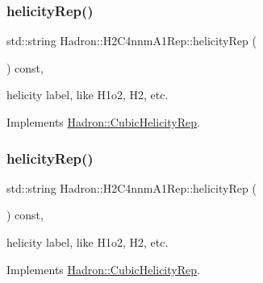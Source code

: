 \mbox{\label{structHadron_1_1H2C4nnmA1Rep_a383c3c921c06e12e6ad53f2acb09bda1}} 
\subsubsection{\texorpdfstring{helicityRep()}{helicityRep()}\hspace{0.1cm}{\footnotesize\ttfamily [1/2]}}
{\footnotesize\ttfamily std\+::string Hadron\+::\+H2\+C4nnm\+A1\+Rep\+::helicity\+Rep (\begin{DoxyParamCaption}{ }\end{DoxyParamCaption}) const\hspace{0.3cm}{\ttfamily [inline]}, {\ttfamily [virtual]}}

helicity label, like H1o2, H2, etc. 

Implements \mbox{\hyperlink{structHadron_1_1CubicHelicityRep_af1096946b7470edf0a55451cc662f231}{Hadron\+::\+Cubic\+Helicity\+Rep}}.

\mbox{\label{structHadron_1_1H2C4nnmA1Rep_a383c3c921c06e12e6ad53f2acb09bda1}} 
\subsubsection{\texorpdfstring{helicityRep()}{helicityRep()}\hspace{0.1cm}{\footnotesize\ttfamily [2/2]}}
{\footnotesize\ttfamily std\+::string Hadron\+::\+H2\+C4nnm\+A1\+Rep\+::helicity\+Rep (\begin{DoxyParamCaption}{ }\end{DoxyParamCaption}) const\hspace{0.3cm}{\ttfamily [inline]}, {\ttfamily [virtual]}}

helicity label, like H1o2, H2, etc. 

Implements \mbox{\hyperlink{structHadron_1_1CubicHelicityRep_af1096946b7470edf0a55451cc662f231}{Hadron\+::\+Cubic\+Helicity\+Rep}}.

\mbox{\label{structHadron_1_1H2C4nnmA1Rep_ab84ffb9381f49b933c6c3fdf5936fa92}} 
